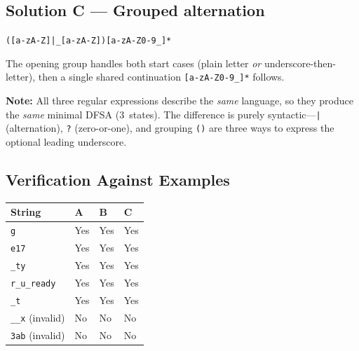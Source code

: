 \documentclass[a4paper,12pt]{article}
\begin{document}
\subsection{Solution C --- Grouped alternation}

\begin{center}
\large
\texttt{([a-zA-Z]|\_[a-zA-Z])[a-zA-Z0-9\_]*}
\end{center}

The opening group handles both start cases (plain letter \emph{or}
underscore-then-letter), then a single shared continuation
\texttt{[a-zA-Z0-9\_]*} follows.

\begin{center}
\end{center}

\medskip\noindent
\textbf{Note:} All three regular expressions describe the \emph{same}
language, so they produce the \emph{same} minimal DFSA (3~states).
The difference is purely syntactic---\texttt{|} (alternation),
\texttt{?} (zero-or-one), and grouping \texttt{()} are three ways to
express the optional leading underscore.

\subsection{Verification Against Examples}

\begin{center}
\renewcommand{\arraystretch}{1.3}
\begin{tabular}{llll}
\toprule
\textbf{String} & \textbf{A} & \textbf{B} & \textbf{C} \\
\midrule
\texttt{g}            & Yes & Yes & Yes \\
\texttt{e17}          & Yes & Yes & Yes \\
\texttt{\_ty}         & Yes & Yes & Yes \\
\texttt{r\_u\_ready}  & Yes & Yes & Yes \\
\texttt{\_t}          & Yes & Yes & Yes \\
\texttt{\_\_x} (invalid) & No & No & No \\
\texttt{3ab}  (invalid) & No & No & No \\
\bottomrule
\end{tabular}
\end{center}
\end{document}
